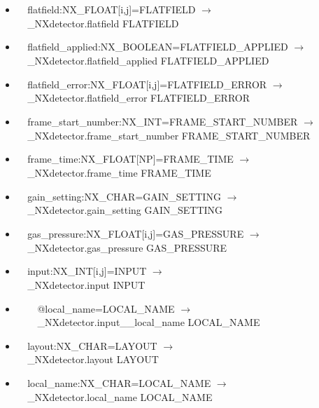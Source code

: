 \documentclass[11pt]{article}
\begin{document}
{{\begin{itemize}
\item{\verb|  |flatfield:NX\_FLOAT[i,j]=FLATFIELD $\rightarrow$\\
\verb|  |\_NXdetector.flatfield FLATFIELD}

\item{\verb|  |flatfield\_applied:NX\_BOOLEAN=FLATFIELD\_APPLIED $\rightarrow$\\
\verb|  |\_NXdetector.flatfield\_applied FLATFIELD\_APPLIED}

\item{\verb|  |flatfield\_error:NX\_FLOAT[i,j]=FLATFIELD\_ERROR $\rightarrow$\\
\verb|  |\_NXdetector.flatfield\_error FLATFIELD\_ERROR}

\item{\verb|  |frame\_start\_number:NX\_INT=FRAME\_START\_NUMBER $\rightarrow$\\
\verb|  |\_NXdetector.frame\_start\_number FRAME\_START\_NUMBER}

\item{\verb|  |frame\_time:NX\_FLOAT[NP]=FRAME\_TIME $\rightarrow$\\
\verb|  |\_NXdetector.frame\_time FRAME\_TIME}

\item{\verb|  |gain\_setting:NX\_CHAR=GAIN\_SETTING $\rightarrow$\\
\verb|  |\_NXdetector.gain\_setting GAIN\_SETTING}

\item{\verb|  |gas\_pressure:NX\_FLOAT[i,j]=GAS\_PRESSURE $\rightarrow$\\
\verb|  |\_NXdetector.gas\_pressure GAS\_PRESSURE}

\item{\verb|  |input:NX\_INT[i,j]=INPUT $\rightarrow$\\
\verb|  |\_NXdetector.input INPUT}

\item{\verb|    |@local\_name=LOCAL\_NAME $\rightarrow$\\
\verb|    |\_NXdetector.input\_\_local\_name LOCAL\_NAME}

\item{\verb|  |layout:NX\_CHAR=LAYOUT $\rightarrow$\\
\verb|  |\_NXdetector.layout LAYOUT}

\item{\verb|  |local\_name:NX\_CHAR=LOCAL\_NAME $\rightarrow$\\
\verb|  |\_NXdetector.local\_name LOCAL\_NAME}


\end{itemize}}}
\end{document}
